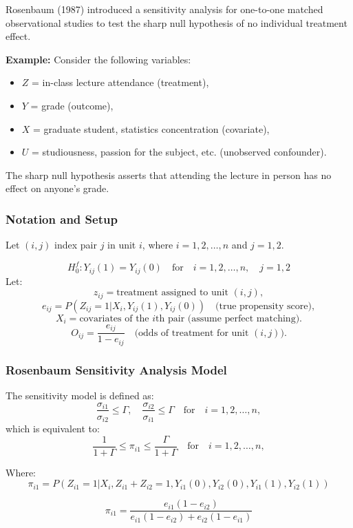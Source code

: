 Rosenbaum (1987) introduced a sensitivity analysis for one-to-one matched observational studies to test the sharp null hypothesis of no individual treatment effect.

\textbf{Example:} Consider the following variables:
\begin{itemize}
    \item \( Z \) = in-class lecture attendance (treatment),
    \item \( Y \) = grade (outcome),
    \item \( X \) = graduate student, statistics concentration (covariate),
    \item \( U \) = studiousness, passion for the subject, etc. (unobserved confounder).
\end{itemize}

The sharp null hypothesis asserts that attending the lecture in person has no effect on anyone’s grade.

\subsubsection{Notation and Setup}

Let \((i, j)\) index pair \(j\) in unit \(i\), where \( i = 1, 2, \dots, n \) and \( j = 1, 2 \).

\[
H_0^f: Y_{ij}(1) = Y_{ij}(0) \quad \text{for} \quad i = 1, 2, \dots, n, \quad j = 1, 2
\]
Let:
\[
z_{ij} = \text{treatment assigned to unit } (i,j),
\]
\[
e_{ij} = P(Z_{ij} = 1 | X_i, Y_{ij}(1), Y_{ij}(0)) \quad \text{(true propensity score)},
\]
\[
X_i = \text{covariates of the } i \text{th pair (assume perfect matching)}.
\]
\[
O_{ij} = \frac{e_{ij}}{1 - e_{ij}} \quad \text{(odds of treatment for unit } (i, j)\text{)}.
\]

\subsubsection{Rosenbaum Sensitivity Analysis Model}

The sensitivity model is defined as:
\[
\frac{\sigma_{i1}}{\sigma_{i2}} \leq \Gamma, \quad \frac{\sigma_{i2}}{\sigma_{i1}} \leq \Gamma \quad \text{for} \quad i = 1, 2, \dots, n,
\]
which is equivalent to:
\[
\frac{1}{1 + \Gamma} \leq \pi_{i1} \leq \frac{\Gamma}{1 + \Gamma} \quad \text{for} \quad i = 1, 2, \dots, n,
\]

Where: 
\[\pi_{i1}=P(Z_{i1}=1|X_i, Z_{i1}+Z_{i2}=1, Y_{i1}(0), Y_{i2}(0), Y_{i1}(1), Y_{i2}(1))\]

\[\pi_{i1}=\frac{e_{i1}(1-e_{i2})}{e_{i1}(1-e_{i2})+e_{i2}(1-e_{i1})}\]

